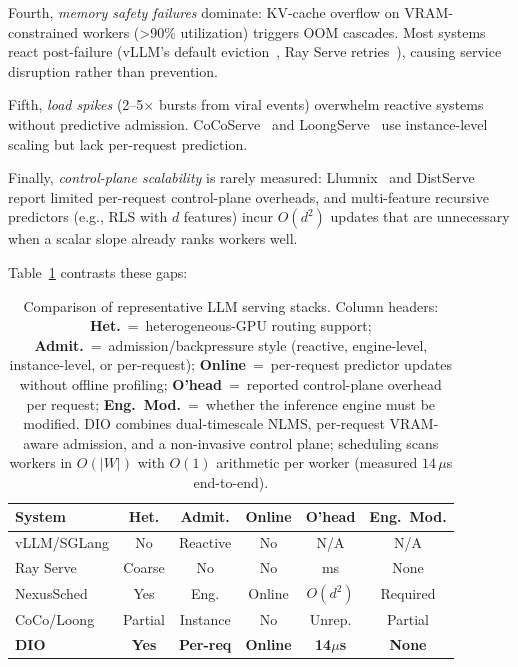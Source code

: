 \documentclass[10pt,twocolumn,letterpaper]{article}
\begin{document}
Fourth, \emph{memory safety failures} dominate: KV-cache overflow on VRAM-constrained workers (>90\% utilization) triggers OOM cascades. Most systems react post-failure (vLLM's default eviction~\cite{vllm}, Ray Serve retries~\cite{rayserve}), causing service disruption rather than prevention.

Fifth, \emph{load spikes} (2--5$\times$ bursts from viral events) overwhelm reactive systems without predictive admission. CoCoServe~\cite{CocoServe} and LoongServe~\cite{loongserve} use instance-level scaling but lack per-request prediction.

Finally, \emph{control-plane scalability} is rarely measured: Llumnix~\cite{llumnix} and DistServe report limited per-request control-plane overheads, and multi-feature recursive predictors (e.g., RLS with $d$ features) incur $O(d^2)$ updates that are unnecessary when a scalar slope already ranks workers well.

Table~\ref{tab:systems_comparison} contrasts these gaps:

\begin{table}[h]
\centering
\scriptsize
\setlength{\tabcolsep}{3pt}
\begin{tabular}{@{}lccccc@{}}
\toprule
\textbf{System} & \textbf{Het.} & \textbf{Admit.} & \textbf{Online} & \textbf{O'head} & \textbf{Eng.\ Mod.} \\
\midrule
vLLM/SGLang & No & Reactive & No & N/A & N/A \\
Ray Serve & Coarse & No & No & ms & None \\
NexusSched & Yes & Eng. & Online & $O(d^2)$ & Required \\
CoCo/Loong & Partial & Instance & No & Unrep. & Partial \\
\textbf{DIO} & \textbf{Yes} & \textbf{Per-req} & \textbf{Online} & \textbf{14$\mu$s} & \textbf{None} \\
\bottomrule
\end{tabular}
\caption{Comparison of representative LLM serving stacks. Column headers: \textbf{Het.}~=~heterogeneous-GPU routing support; \textbf{Admit.}~=~admission/backpressure style (reactive, engine-level, instance-level, or per-request); \textbf{Online}~=~per-request predictor updates without offline profiling; \textbf{O'head}~=~reported control-plane overhead per request; \textbf{Eng.\ Mod.}~=~whether the inference engine must be modified. DIO combines dual-timescale NLMS, per-request VRAM-aware admission, and a non-invasive control plane; scheduling scans workers in $O(|W|)$ with $O(1)$ arithmetic per worker (measured $14\,\mu$s end-to-end).}
\label{tab:systems_comparison}
\end{table}
\end{document}
